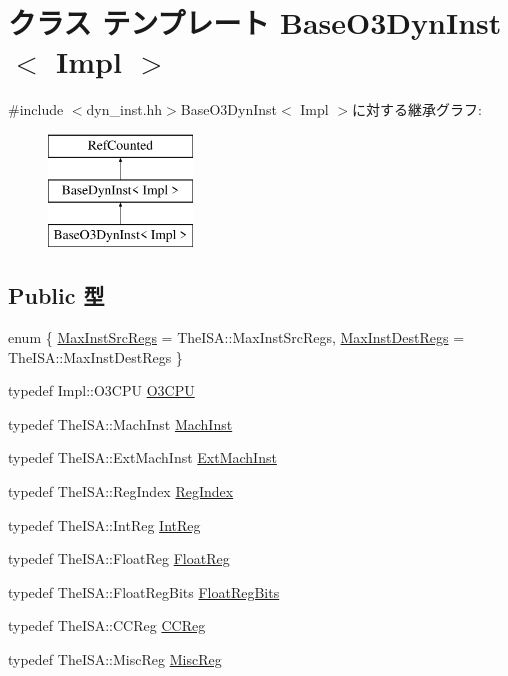 \hypertarget{classBaseO3DynInst}{
\section{クラス テンプレート BaseO3DynInst$<$ Impl $>$}
\label{classBaseO3DynInst}
}


{\ttfamily \#include $<$dyn\_\-inst.hh$>$}BaseO3DynInst$<$ Impl $>$に対する継承グラフ:\begin{figure}[H]
\begin{center}
\leavevmode
\includegraphics[height=3cm]{classBaseO3DynInst}
\end{center}
\end{figure}
\subsection*{Public 型}
\begin{DoxyCompactItemize}
\item 
enum \{ \hyperlink{classBaseO3DynInst_a4caf8d8f829279fba122163d961608a4a17b78fe104e3bf28fca535a040514084}{MaxInstSrcRegs} =  TheISA::MaxInstSrcRegs, 
\hyperlink{classBaseO3DynInst_a4caf8d8f829279fba122163d961608a4a6a2e9b17a83d01eb4ee6bbdd739be9eb}{MaxInstDestRegs} =  TheISA::MaxInstDestRegs
 \}
\item 
typedef Impl::O3CPU \hyperlink{classBaseO3DynInst_a44622cf06940413482836cb62931ac3f}{O3CPU}
\item 
typedef TheISA::MachInst \hyperlink{classBaseO3DynInst_a4617f528417b8f55f809ae0988284c9b}{MachInst}
\item 
typedef TheISA::ExtMachInst \hyperlink{classBaseO3DynInst_a5605d4fc727eae9e595325c90c0ec108}{ExtMachInst}
\item 
typedef TheISA::RegIndex \hyperlink{classBaseO3DynInst_a36d25e03e43fa3bb4c5482cbefe5e0fb}{RegIndex}
\item 
typedef TheISA::IntReg \hyperlink{classBaseO3DynInst_a1355cb78d031430d4d70eb5080267604}{IntReg}
\item 
typedef TheISA::FloatReg \hyperlink{classBaseO3DynInst_a75484259f1855aabc8d74c6eb1cfe186}{FloatReg}
\item 
typedef TheISA::FloatRegBits \hyperlink{classBaseO3DynInst_aab5eeae86499f9bfe15ef79360eccc64}{FloatRegBits}
\item 
typedef TheISA::CCReg \hyperlink{classBaseO3DynInst_a0c9de550a32808e6a25b54b6c791d5ab}{CCReg}
\item 
typedef TheISA::MiscReg \hyperlink{classBaseO3DynInst_aaf5f073a387db0556d1db4bcc45428bc}{MiscReg}
\end{DoxyCompactItemize}
